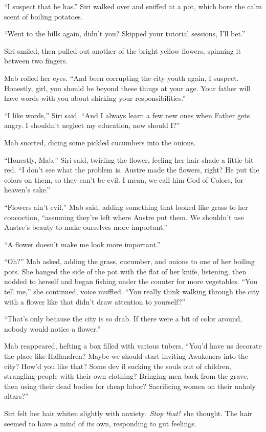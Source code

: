 “I suspect that he has.” Siri walked over and sniffed at a pot, which bore the calm scent of boiling potatoes.

“Went to the hills again, didn’t you? Skipped your tutorial sessions, I’ll bet.”

Siri smiled, then pulled out another of the bright yellow flowers, spinning it between two fingers.

Mab rolled her eyes. “And been corrupting the city youth again, I suspect. Honestly, girl, you should be beyond these things at your age. Your father will have words with you about shirking your responsibilities.”

“I like words,” Siri said. “And I always learn a few new ones when Father gets angry. I shouldn’t neglect my education, now should I?”

Mab snorted, dicing some pickled cucumbers into the onions.

“Honestly, Mab,” Siri said, twirling the flower, feeling her hair shade a little bit red. “I don’t see what the problem is. Austre made the flowers, right? He put the colors on them, so they can’t be evil. I mean, we call him God of Colors, for heaven’s sake.”

“Flowers ain’t evil,” Mab said, adding something that looked like grass to her concoction, “assuming they’re left where Austre put them. We shouldn’t use Austre’s beauty to make ourselves more important.”

“A flower doesn’t make me look more important.”

“Oh?” Mab asked, adding the grass, cucumber, and onions to one of her boiling pots. She banged the side of the pot with the flat of her knife, listening, then nodded to herself and began fishing under the counter for more vegetables. “You tell me,” she continued, voice muffled. “You really think walking through the city with a flower like that didn’t draw attention to yourself?”

“That’s only because the city is so drab. If there were a bit of color around, nobody would notice a flower.”

Mab reappeared, hefting a box filled with various tubers. “You’d have us decorate the place like Hallandren? Maybe we should start inviting Awakeners into the city? How’d you like that? Some dev il sucking the souls out of children, strangling people with their own clothing? Bringing men back from the grave, then using their dead bodies for cheap labor? Sacrificing women on their unholy altars?”

Siri felt her hair whiten slightly with anxiety.~\textit{Stop that!}~she thought. The hair seemed to have a mind of its own, responding to gut feelings.

